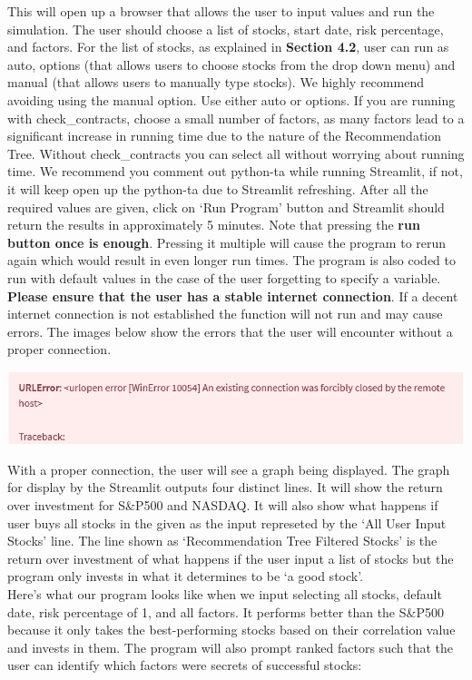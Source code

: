 \documentclass[fontsize=11pt]{article}
\begin{document}
This will open up a browser that allows the user to input values and run the simulation. The user should choose a list of stocks, start date, risk percentage, and factors. For the list of stocks, as explained in \textbf{Section 4.2}, user can run as auto, options (that allows users to choose stocks from the drop down menu) and manual (that allows users to manually type stocks). We highly recommend avoiding using the manual option. Use either auto or options. If you are running with check\_contracts, choose a small number of factors, as many factors lead to a significant increase in running time due to the nature of the Recommendation Tree. Without check\_contracts you can select all without worrying about running time. We recommend you comment out python-ta while running Streamlit, if not, it will keep open up the python-ta due to Streamlit refreshing. After all the required values are given, click on `Run Program' button and Streamlit should return the results in approximately 5 minutes. Note that pressing the \textbf{run button once is enough}. Pressing it multiple will cause the program to rerun again which would result in even longer run times. The program is also coded to run with default values in the case of the user forgetting to specify a variable. \textbf{Please ensure that the user has a stable internet connection}. If a decent internet connection is not established the function will not run and may cause errors. The images below show the errors that the user will encounter without a proper connection. 
\begin{center}
\includegraphics[scale=0.65]{error.png}
\end{center}
With a proper connection, the user will see a graph being displayed. The graph for display by the Streamlit outputs four distinct lines. It will show the return over investment for S\&P500 and NASDAQ. It will also show what happens if user buys all stocks in the given as the input represeted by the `All User Input Stocks' line. The line shown as `Recommendation Tree Filtered Stocks' is the return over investment of what happens if the user input a list of stocks but the program only invests in what it determines to be `a good stock'.\\

Here's what our program looks like when we input selecting all stocks, default date, risk percentage of 1, and all factors. It performs better than the S\&P500 because it only takes the best-performing stocks based on their correlation value and invests in them. The program will also prompt ranked factors such that the user can identify which factors were secrets of successful stocks:
\end{document}
